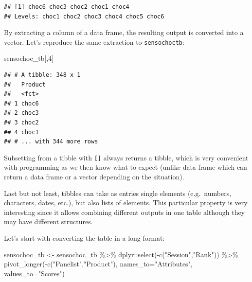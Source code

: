 \documentclass[
]{krantz}
\makeatletter
\newenvironment{Shaded}{\begin{snugshade}}{\end{snugshade}}
\newcommand{\AttributeTok}[1]{\textcolor[rgb]{0.61,0.61,0.61}{#1}}
\newcommand{\DecValTok}[1]{\textcolor[rgb]{0.06,0.06,0.06}{#1}}
\newcommand{\FunctionTok}[1]{\textcolor[rgb]{0,0,0}{#1}}
\newcommand{\NormalTok}[1]{#1}
\newcommand{\OtherTok}[1]{\textcolor[rgb]{0.37,0.37,0.37}{#1}}
\newcommand{\SpecialCharTok}[1]{\textcolor[rgb]{0,0,0}{#1}}
\newcommand{\StringTok}[1]{\textcolor[rgb]{0.5,0.5,0.5}{#1}}
\newenvironment{kframe}{%
\medskip{}
\setlength{\fboxsep}{.8em}
 \def\at@end@of@kframe{}%
 \ifinner\ifhmode%
  \def\at@end@of@kframe{\end{minipage}}%
  \begin{minipage}{\columnwidth}%
 \fi\fi%
 \def\FrameCommand##1{\hskip\@totalleftmargin \hskip-\fboxsep
 \colorbox{shadecolor}{##1}\hskip-\fboxsep
     \hskip-\linewidth \hskip-\@totalleftmargin \hskip\columnwidth}%
 \MakeFramed {\advance\hsize-\width
   \@totalleftmargin\z@ \linewidth\hsize
   \@setminipage}}%
 {\par\unskip\endMakeFramed%
 \at@end@of@kframe}
\renewenvironment{Shaded}{\begin{kframe}}{\end{kframe}}
\makeatother
\begin{document}
\begin{verbatim}
## [1] choc6 choc3 choc2 choc1 choc4
## Levels: choc1 choc2 choc3 choc4 choc5 choc6
\end{verbatim}

By extracting a column of a data frame, the resulting output is converted into a vector.
Let's reproduce the same extraction to \texttt{sensochoctb}:

\begin{Shaded}
\begin{Highlighting}[]
\NormalTok{sensochoc\_tb[,}\DecValTok{4}\NormalTok{]}
\end{Highlighting}
\end{Shaded}

\begin{verbatim}
## # A tibble: 348 x 1
##   Product
##   <fct>  
## 1 choc6  
## 2 choc3  
## 3 choc2  
## 4 choc1  
## # ... with 344 more rows
\end{verbatim}

Subsetting from a tibble with \texttt{{[}{]}} always returns a tibble, which is very convenient with programming as we then know what to expect (unlike data frame which can return a data frame or a vector depending on the situation).

Last but not least, tibbles can take as entries single elements (e.g.~numbers, characters, dates, etc.), but also lists of elements. This particular property is very interesting since it allows combining different outputs in one table although they may have different structures.

Let's start with converting the table in a long format:

\begin{Shaded}
\begin{Highlighting}[]
\NormalTok{sensochoc\_tb }\OtherTok{\textless{}{-}}\NormalTok{ sensochoc\_tb }\SpecialCharTok{\%\textgreater{}\%}
\NormalTok{  dplyr}\SpecialCharTok{::}\FunctionTok{select}\NormalTok{(}\SpecialCharTok{{-}}\FunctionTok{c}\NormalTok{(}\StringTok{"Session"}\NormalTok{,}\StringTok{"Rank"}\NormalTok{)) }\SpecialCharTok{\%\textgreater{}\%} 
  \FunctionTok{pivot\_longer}\NormalTok{(}\SpecialCharTok{{-}}\FunctionTok{c}\NormalTok{(}\StringTok{"Panelist"}\NormalTok{,}\StringTok{"Product"}\NormalTok{), }\AttributeTok{names\_to=}\StringTok{"Attributes"}\NormalTok{, }
               \AttributeTok{values\_to=}\StringTok{"Scores"}\NormalTok{)}
\end{Highlighting}
\end{Shaded}
\end{document}
